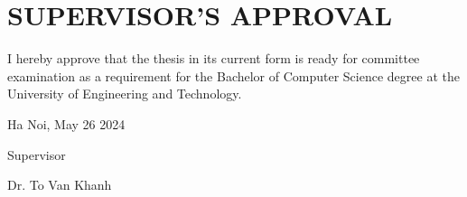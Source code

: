 \chapter*{SUPERVISOR’S APPROVAL}
\fontsize{13}{15}\selectfont

I hereby approve that the thesis in its current form is ready for committee examination as a requirement for the Bachelor of Computer Science degree at the University of Engineering and Technology.

\vspace{1cm}

\begin{flushright}
    Ha Noi, May 26 2024 \par
    Supervisor\hspace*{0.8cm}\par
    \vspace{2.5cm}
    Dr. To Van Khanh\par
\end{flushright}